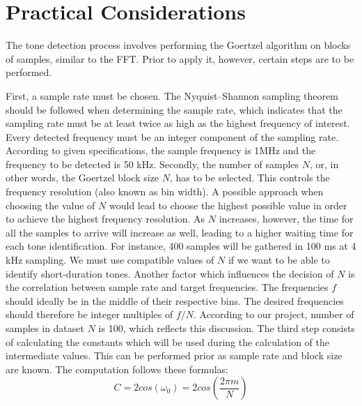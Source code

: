 

\section{Practical Considerations }\label{sec:pc}

The tone detection process involves performing the Goertzel algorithm on blocks of samples, similar to the FFT. Prior to apply it, however, certain steps are to be performed.
    

First, a sample rate must be chosen. The Nyquist–Shannon sampling theorem should be followed when determining the sample rate, which indicates that the sampling rate must be at least twice as high as the highest frequency of interest. Every detected frequency must be an integer component of the sampling rate. According to given specifications, the sample frequency is 1MHz and the frequency to be detected is 50 kHz.
Secondly, the number of samples $N$, or, in other words, the Goertzel block size $N$, has to be selected. This controls the frequency resolution (also known as bin width). A possible approach when choosing the value of $N$ would lead to choose the highest possible value in order to achieve the highest frequency resolution. As $N$ increases, however, the time for all the samples to arrive will increase as well, leading to a higher waiting time for each tone identification. For instance, 400 samples will be gathered in 100 ms at 4 kHz sampling. We must use compatible values of $N$ if we want to be able to identify short-duration tones. Another factor which influences the decision of $N$ is the correlation between sample rate and target frequencies. The frequencies $f$ should ideally be in the middle of their respective bins. The desired frequencies should therefore be integer multiples of $f/N$. According to our project, number of samples in dataset $N$ is 100, which reflects this discussion.
The third step consists of calculating the constants which will be used during the calculation of the intermediate values. This can be performed prior as sample rate and block size are known. The computation follows these formulas:
\begin{equation} \label{eq:COEFF}
C=2cos(\omega_0)=2cos(\frac{2\pi m}{N})
\end{equation}

